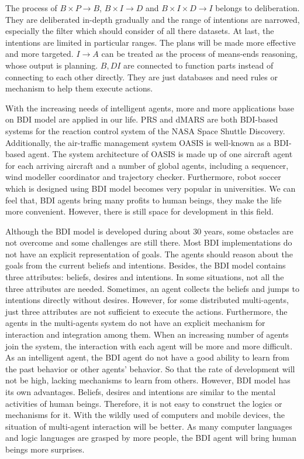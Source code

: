 The process of $B \times P \to B$, $B \times I \to D$ and $B \times I \times D \to I$ belongs to deliberation. They are deliberated in-depth gradually and the range of intentions are narrowed, especially the filter which should consider of all there datasets. At last, the intentions are limited in particular ranges. The plans will be made more effective and more targeted.  $I \to A $ can be treated as the process of means-ends reasoning, whose output is planning. $B,D I$ are connected to function parts instead of connecting to each other directly. They are just databases and need rules or mechanism to help them execute actions.

With the increasing needs of intelligent agents, more and more applications base on BDI model are applied in our life. PRS and dMARS are both BDI-based systems for the reaction control system of the NASA Space Shuttle Discovery. Additionally, the air-traffic management system OASIS is well-known as a BDI-based agent. The system architecture of OASIS is made up of one aircraft agent for each arriving aircraft and a number of global agents, including a sequencer, wind modeller coordinator and trajectory checker\cite{Rao_BDITheory_1995}. Furthermore, robot soccer which is designed using BDI model becomes very popular in universities. We can feel that, BDI agents bring many profits to human beings, they make the life more convenient. However, there is still space for development in this field.

Although the BDI model is developed during about 30 years, some obstacles are not overcome and some challenges are still there. Most BDI implementations do not have an explicit representation of goals. The agents should reason about the goals from the current beliefs and intentions. Besides, the BDI model contains three attributes: beliefs, desires and intentions. In some situations, not all the three attributes are needed. Sometimes, an agent collects the beliefs and jumps to intentions directly without desires. However, for some distributed multi-agents, just three attributes are not sufficient to execute the actions.  Furthermore, the agents in the multi-agents system do not have an explicit mechanism for interaction and integration among them. When an increasing number of agents join the system, the interaction with each agent will be more and more difficult. As an intelligent agent, the BDI agent do not have a good ability to learn from the past behavior or other agents’ behavior. So that the rate of development will not be high, lacking mechanisms to learn from others. However, BDI model has its own advantages. Beliefs, desires and intentions are similar to the mental activities of human beings. Therefore, it is not easy to construct the logics or mechanisms for it. With the wildly used of computers and mobile devices, the situation of multi-agent interaction will be better. As many computer languages and logic languages are grasped by more people, the BDI agent will bring human beings more surprises.

